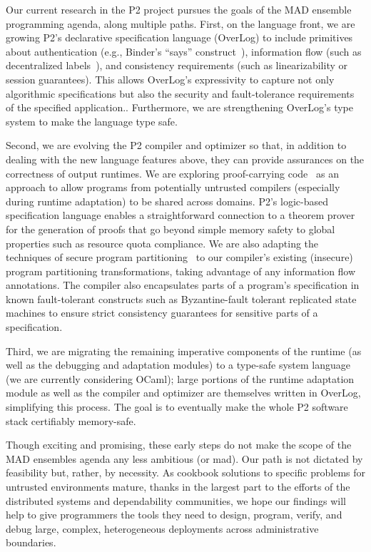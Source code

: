 \documentclass[faircopy]{sig-alternate}
\begin{document}
Our current research in the P2 project pursues the 
goals of the MAD ensemble programming agenda, along multiple
paths. First, on the language front, we are
growing P2's declarative specification language (OverLog) to include
primitives about authentication (e.g., Binder's ``says'' construct~\cite{Abadi2007}),
information flow (such as decentralized labels~\cite{Myers2000}), and
consistency requirements (such as linearizability or session guarantees).
This allows OverLog's  expressivity to capture not only algorithmic
specifications but also the security and fault-tolerance requirements of
the specified application..  Furthermore, we are
strengthening OverLog's type system to make the language type safe.

Second, we are evolving the P2 compiler and optimizer so that, in addition to dealing with the
new language features above, they can provide assurances on the
correctness of output runtimes.  We are exploring proof-carrying
code~\cite{Necula1996} as an approach to allow programs from potentially
untrusted compilers (especially during runtime adaptation) to be shared
across domains. P2's logic-based specification language enables a
straightforward connection to a theorem prover for the generation of
proofs that go beyond simple memory safety to global properties such as
resource quota compliance. We are also adapting the techniques of
secure program partitioning~\cite{Zdancewic2001} to our compiler's
existing (insecure) program partitioning transformations, taking
advantage of any information flow annotations.  The compiler also
encapsulates parts of a program's specification in known fault-tolerant
constructs such as Byzantine-fault tolerant replicated state machines to
ensure strict consistency guarantees for sensitive parts of a specification.

Third, we are migrating the remaining imperative components of the
runtime (as well as the debugging and adaptation modules) to a type-safe
system language (we are currently considering OCaml); large portions of
the runtime adaptation module as well as the compiler and optimizer are
themselves written in OverLog, simplifying this process.  The goal is to
eventually make the whole P2 software stack certifiably memory-safe.

Though exciting and promising, these early steps do not make the scope
of the MAD ensembles agenda any less ambitious (or mad).  Our path is
not dictated by feasibility but, rather, by necessity. As cookbook
solutions to specific problems for untrusted environments mature, thanks
in the largest  part to the efforts of the distributed systems and dependability communities, we hope our findings will
help to give programmers the tools they need to design, program,
verify, and debug large, complex, heterogeneous deployments across
administrative boundaries.


{


}
\end{document}
